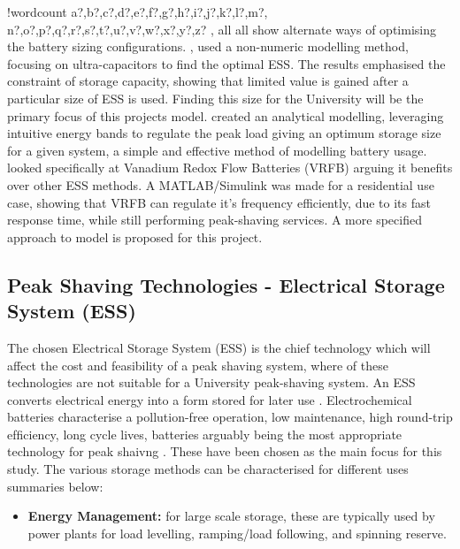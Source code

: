 \documentclass[10pt]{article}
\providecommand{\tightlist}{%
  \setlength{\itemsep}{0pt}\setlength{\parskip}{0pt}}
\newcounter{words}
\newenvironment{counted}{%
  \setcounter{words}{0}
  \SearchList!{wordcount}{\stepcounter{words}}
    {a?,b?,c?,d?,e?,f?,g?,h?,i?,j?,k?,l?,m?,
    n?,o?,p?,q?,r?,s?,t?,u?,v?,w?,x?,y?,z?}
  \UndoBoundary{'}
  \SearchOrder{p;}}{%
  \StopSearching}
\begin{document}
\begin{counted}
\cite{20160601898032}, \cite{Levron201280} all \cite{5371839} all show
alternate ways of optimising the battery sizing configurations.
\cite{5371839}, used a non-numeric modelling method, focusing on
ultra-capacitors to find the optimal ESS. The results emphasised the
constraint of storage capacity, showing that limited value is gained
after a particular size of ESS is used. Finding this size for the
University will be the primary focus of this projects model.
\cite{Levron201280} created an analytical modelling, leveraging
intuitive energy bands to regulate the peak load giving an optimum
storage size for a given system, a simple and effective method of
modelling battery usage. \cite{20160601898032} looked specifically at
Vanadium Redox Flow Batteries (VRFB) arguing it benefits over other ESS
methods. A MATLAB/Simulink was made for a residential use case, showing
that VRFB can regulate it's frequency efficiently, due to its fast
response time, while still performing peak-shaving services. A more
specified approach to \cite{20160601898032} model is proposed for this
project.

\subsection{Peak Shaving Technologies - Electrical Storage System
(ESS)}\label{peak-shaving-technologies---electrical-storage-system-ess}

The chosen Electrical Storage System (ESS) is the chief technology which
will affect the cost and feasibility of a peak shaving system, where of
these technologies are not suitable for a University peak-shaving
system. An ESS converts electrical energy into a form stored for later
use \cite{Chen2009291}. Electrochemical batteries characterise a
pollution-free operation, low maintenance, high round-trip efﬁciency,
long cycle lives, batteries arguably being the most appropriate
technology for peak shaivng\cite{liao2016a} \cite{Dunn928}. These have
been chosen as the main focus for this study. The various storage
methods can be characterised for different uses summaries below:

\begin{itemize}
\tightlist
\item
  \textbf{Energy Management:} for large scale storage, these are
  typically used by power plants for load levelling, ramping/load
  following, and spinning reserve.


\end{itemize}
\end{counted}
\end{document}
